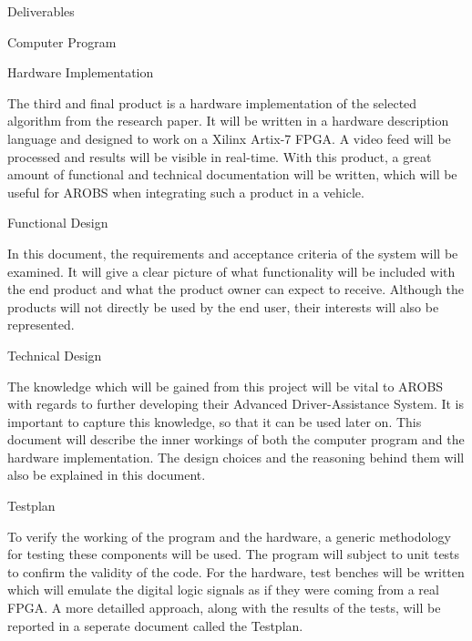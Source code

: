 \documentclass{matthijs}
\begin{document}
\begin{hoofdstuk}{Deliverables}
\begin{paragraaf}{Computer Program}
		\end{paragraaf}

		\begin{paragraaf}{Hardware Implementation}
		
			The third and final product is a hardware implementation of the selected algorithm from the research paper.
			It will be written in a hardware description language and designed to work on a Xilinx Artix-7 FPGA.
			A video feed will be processed and results will be visible in real-time.
			With this product, a great amount of functional and technical documentation will be written, which will be useful for AROBS when integrating such a product in a vehicle.
		
		\end{paragraaf}

		\begin{paragraaf}{Functional Design}

			In this document, the requirements and acceptance criteria of the system will be examined.
			It will give a clear picture of what functionality will be included with the end product and what the product owner can expect to receive.
			Although the products will not directly be used by the end user, their interests will also be represented.

		\end{paragraaf}

		\begin{paragraaf}{Technical Design}

			The knowledge which will be gained from this project will be vital to AROBS with regards to further developing their Advanced Driver-Assistance System.
			It is important to capture this knowledge, so that it can be used later on.
			This document will describe the inner workings of both the computer program and the hardware implementation.
			The design choices and the reasoning behind them will also be explained in this document.

		\end{paragraaf}

		\begin{paragraaf}{Testplan}

			To verify the working of the program and the hardware, a generic methodology for testing these components will be used.
			The program will subject to unit tests to confirm the validity of the code.
			For the hardware, test benches will be written which will emulate the digital logic signals as if they were coming from a real FPGA.
			A more detailled approach, along with the results of the tests, will be reported in a seperate document called the Testplan.

		\end{paragraaf}
	
	\end{hoofdstuk}
\end{document}
